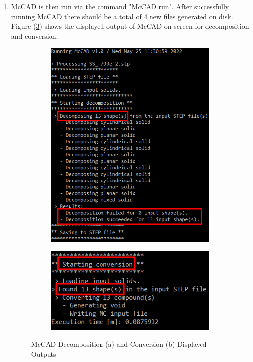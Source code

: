 \documentclass[letterpaper, 12 pt]{report}
\begin{document}
\begin{enumerate}
  \item McCAD is then run via the command "McCAD run". After successfully running McCAD there should be a total of 4 new files generated on disk. Figure (\ref{fig:McCAD Decomposition and Conversion Outputs}) shows the displayed output of McCAD on screen for decomposition and conversion.
  \begin{figure}[h]
  	\centering
  	\begin{subfigure}{.5\textwidth}
  		\centering
  		\includegraphics[width=.8\linewidth]{figures/McCAD_output_decomposition.png}
  		\caption{}
  		\label{fig:a}
  	\end{subfigure}%
  	\begin{subfigure}{.5\textwidth}
  		\centering
  		\includegraphics[width=.8\linewidth]{figures/McCAD_output_conversion.png}
  		\caption{}
  		\label{fig:b}
  	\end{subfigure}
  	\caption{McCAD Decomposition (a) and Conversion (b) Displayed Outputs}
  	\label{fig:McCAD Decomposition and Conversion Outputs}
  \end{figure}


\end{enumerate}
\end{document}
